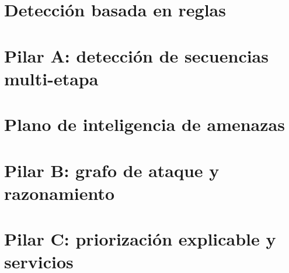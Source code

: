 
\section{Detección basada en reglas}

\section{Pilar A: detección de secuencias multi-etapa}

\section{Plano de inteligencia de amenazas}

\section{Pilar B: grafo de ataque y razonamiento}

\section{Pilar C: priorización explicable y servicios}
